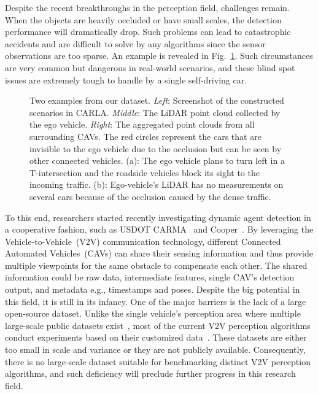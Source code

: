 Despite the recent breakthroughs in the perception field, challenges remain. When the objects are heavily occluded or have small scales, the detection performance will dramatically drop. Such problems can lead to catastrophic accidents and are difficult to solve by any algorithms since the sensor observations are too sparse. An example is revealed in Fig.~\ref{fig:overview-a}. Such circumstances are very common but dangerous in real-world scenarios, and these blind spot issues are extremely tough to handle by a single self-driving car. 

\begin{figure*}[!t]
\centering
\begin{subfigure}[c]{0.9\linewidth}
    \caption{}
    \label{fig:overview-a}
\end{subfigure}
\begin{subfigure}[c]{0.9\linewidth}
    \caption{}
\end{subfigure}
\caption{Two examples from our dataset. \emph{Left}: Screenshot of the constructed scenarios in CARLA. \emph{Middle}: The LiDAR point cloud collected by the ego vehicle. \emph{Right}: The aggregated point clouds from all surrounding CAVs. The red circles represent the cars that are invisible to the ego vehicle due to the occlusion but can be seen by other connected vehicles. (a): The ego vehicle plans to turn left in a T-intersection and the roadside vehicles block its sight to the incoming traffic. (b): Ego-vehicle's LiDAR has no measurements on several cars because of the occlusion caused by the dense traffic.}
\label{fig:overview}
\end{figure*}

To this end, researchers started recently investigating dynamic agent detection in a cooperative fashion, such as USDOT CARMA~\cite{lochrane2020carma} and Cooper~\cite{cooper}. By leveraging the Vehicle-to-Vehicle~(V2V) communication technology, different Connected Automated Vehicles~(CAVs) can share their sensing information and thus provide multiple viewpoints for the same obstacle to compensate each other. The shared information could be raw data, intermediate features, single CAV's detection output, and metadata e.g., timestamps and poses. Despite the big potential in this field, it is still in its infancy. One of the major barriers is the lack of a large open-source dataset. Unlike the single vehicle's perception area where multiple large-scale public datasets exist~\cite{nuscenes2019, sun2020scalability, Geiger2013IJRR}, most of the current V2V perception algorithms conduct experiments based on their customized data~\cite{Wang2020V2VNetVC, rawaw018, Zhang2021DistributedDM}. These datasets are either too small in scale and variance or they are not publicly available. Consequently, there is no large-scale dataset suitable for benchmarking distinct V2V perception algorithms, and such deficiency will preclude further progress in this research field. 

